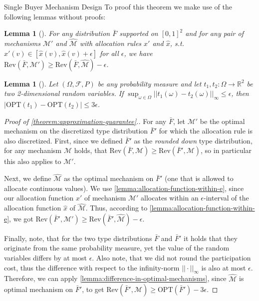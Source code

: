 \documentclass[11pt,a4paper]{article}
\newtheorem{lemma}[theorem]{Lemma}
\newcommand{\1}[1]{\mbox{\rm\bf 1}_{#1}}
\begin{document}
\begin{section}{Single Buyer Mechanism Design}
 To proof this theorem we make use of the following lemmas without proofs:

 \begin{lemma}[\citet{primary}]
     \label{lemma:allocation-function-within-e}
     For any distribution $\bar{F}$ supported on $[0,1]^2$ and for any pair of mechanisms $\mathcal{M}'$ and $\widehat{\mathcal{M}}$
     with allocation rules $x'$ and $\hat{x}$, s.t. $x'(v) \in [\hat{x}(v), \hat{x}(v) + \epsilon]$ for all $\epsilon$, we have $\mathrm{Rev}(\bar{F}, \mathcal{M}') \geq \mathrm{Rev}(\bar{F}, \widehat{\mathcal{M}}) - \epsilon$.
 \end{lemma}
 \begin{lemma}[\citet{primary}]
     \label{lemma:difference-in-optimal-mechanisms}
     Let $(\Omega, \mathcal{F}, P)$ be any probability measure and let $t_1, t_2: \Omega \rightarrow \mathbb{R}^2$ be two 2-dimensional random variables.
     If $\sup_{\omega \in \Omega} || t_1(\omega) - t_2(\omega) ||_\infty \leq \epsilon$, then $|\mathrm{OPT}(t_1) - \mathrm{OPT}(t_2)| \leq 3\epsilon$.
 \end{lemma}

 \begin{proof}[Proof of \autoref{theorem:approximation-guarantee}.]
     For any $\bar{F}$, let $\mathcal{M}'$ be the optimal mechanism on the discretized type distribution $\bar{F}'$ for which the allocation rule is also discretized.
     First, since we defined $\bar{F}'$ as the \textit{rounded down} type distribution, for any mechanism $\mathcal{M}$ holds, that $\mathrm{Rev}(\bar{F}, \mathcal{M}) \geq \mathrm{Rev}(\bar{F}', \mathcal{M})$, so in particular this also applies to $\mathcal{M}'$.

     Next, we define $\widehat{\mathcal{M}}$ as the optimal mechanism on $\bar{F}'$ (one that is allowed to allocate continuous values).
     We use \autoref{lemma:allocation-function-within-e}, since our allocation function $x'$ of mechanism $\mathcal{M}'$
     allocates within an $\epsilon$-interval of the allocation function $\hat{x}$ of $\widehat{\mathcal{M}}$.
     Thus, according to \autoref{lemma:allocation-function-within-e}, we got $\mathrm{Rev}(\bar{F}', \mathcal{M}') \geq \mathrm{Rev}(\bar{F}', \widehat{\mathcal{M}}) - \epsilon$.

     Finally, note, that for the two type distributions $\bar{F}$ and $\bar{F}'$ it holds that they originate from the same probability measure, yet the value of the random variables differs by at most $\epsilon$.
     Also note, that we did not round the participation cost, thus the difference with respect to the infinity-norm $|| \cdot ||_{\infty}$ is also at most $\epsilon$.
     Therefore, we can apply \autoref{lemma:difference-in-optimal-mechanisms}, since $\widehat{\mathcal{M}}$ is optimal mechanism on $\bar{F}'$,
     to get $\mathrm{Rev}(\bar{F}', \widehat{\mathcal{M}}) \geq \mathrm{OPT}(\bar{F}') - 3\epsilon$.


\end{proof}
\end{section}
\end{document}
